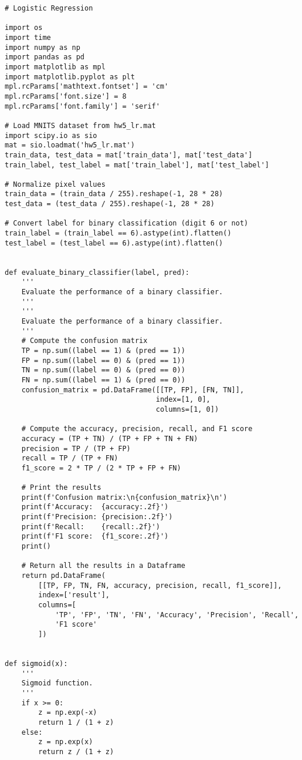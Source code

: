 \clearpage
\begin{verbatim}
# Logistic Regression

import os
import time
import numpy as np
import pandas as pd
import matplotlib as mpl
import matplotlib.pyplot as plt
mpl.rcParams['mathtext.fontset'] = 'cm'
mpl.rcParams['font.size'] = 8
mpl.rcParams['font.family'] = 'serif'

# Load MNITS dataset from hw5_lr.mat
import scipy.io as sio
mat = sio.loadmat('hw5_lr.mat')
train_data, test_data = mat['train_data'], mat['test_data']
train_label, test_label = mat['train_label'], mat['test_label']

# Normalize pixel values
train_data = (train_data / 255).reshape(-1, 28 * 28)
test_data = (test_data / 255).reshape(-1, 28 * 28)

# Convert label for binary classification (digit 6 or not)
train_label = (train_label == 6).astype(int).flatten()
test_label = (test_label == 6).astype(int).flatten()


def evaluate_binary_classifier(label, pred):
    '''
    Evaluate the performance of a binary classifier.
    '''
    '''
    Evaluate the performance of a binary classifier.
    '''
    # Compute the confusion matrix
    TP = np.sum((label == 1) & (pred == 1))
    FP = np.sum((label == 0) & (pred == 1))
    TN = np.sum((label == 0) & (pred == 0))
    FN = np.sum((label == 1) & (pred == 0))
    confusion_matrix = pd.DataFrame([[TP, FP], [FN, TN]],
                                    index=[1, 0],
                                    columns=[1, 0])

    # Compute the accuracy, precision, recall, and F1 score
    accuracy = (TP + TN) / (TP + FP + TN + FN)
    precision = TP / (TP + FP)
    recall = TP / (TP + FN)
    f1_score = 2 * TP / (2 * TP + FP + FN)

    # Print the results
    print(f'Confusion matrix:\n{confusion_matrix}\n')
    print(f'Accuracy:  {accuracy:.2f}')
    print(f'Precision: {precision:.2f}')
    print(f'Recall:    {recall:.2f}')
    print(f'F1 score:  {f1_score:.2f}')
    print()

    # Return all the results in a Dataframe
    return pd.DataFrame(
        [[TP, FP, TN, FN, accuracy, precision, recall, f1_score]],
        index=['result'],
        columns=[
            'TP', 'FP', 'TN', 'FN', 'Accuracy', 'Precision', 'Recall',
            'F1 score'
        ])


def sigmoid(x):
    '''
    Sigmoid function.
    '''
    if x >= 0:
        z = np.exp(-x)
        return 1 / (1 + z)
    else:
        z = np.exp(x)
        return z / (1 + z)



\end{verbatim}
